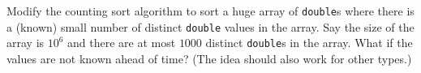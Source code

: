   Modify the counting sort algorithm to sort a huge array of \verb!double!s
  where there is a (known) small number of distinct \verb!double! values in the 
  array.
  Say the size of the array is $10^6$ and there are at most $1000$ distinct
  \verb!double!s in the array.
  What if the values are not known ahead of time?
  (The idea should also work for other types.)

